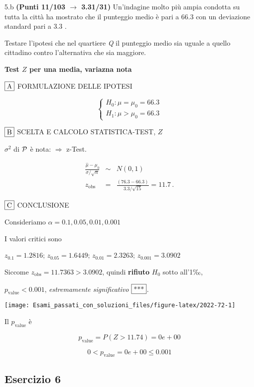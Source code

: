 \documentclass[
  11pt,
]{book}
\theoremstyle{mytheoremstyle}
\theoremstyle{mydefstyle}
\newenvironment{sol}
  {
  \begin{tcolorbox}[enhanced,breakable,arc=0.1mm,boxrule=1pt,colback=white,colframe=iblue,
  title=\bf \fontfamily{lmss}\selectfont \hspace{.5 cm} Soluzione,drop fuzzy shadow]

}{
\end{tcolorbox}
  }
\begin{document}
5.b \textbf{(Punti 11/103 \(\rightarrow\) 3.31/31)} Un'indagine molto più ampia condotta su tutta la città ha mostrato che
il punteggio medio è pari a 66.3 con un deviazione standard pari a 3.3 .

Testare l'ipotesi che nel quartiere \emph{Q} il punteggio medio sia uguale a quello cittadino contro l'alternativa che sia maggiore.

\begin{sol}
\textbf{Test \(Z\) per una media, variazna nota}

\(\fbox{A}\) FORMULAZIONE DELLE IPOTESI

\[\begin{cases}
   H_0: \mu = \mu_0=66.3 \\
   H_1: \mu > \mu_0=66.3 
   \end{cases}\]

\(\fbox{B}\) SCELTA E CALCOLO STATISTICA-TEST, \(Z\)

\(\sigma^{2}\) di \(\cal{P}\) è nota: \(\Rightarrow\) z-Test.

\begin{eqnarray*}
   \frac{\hat\mu - \mu_{0}} {\sigma/\sqrt{n}}&\sim&N(0,1)\\
   z_{\text{obs}}
   &=& \frac{ ( 76.3 -  66.3 )} { 3.3 /\sqrt{ 15 }}
   =   11.7 \, .
   \end{eqnarray*}

\(\fbox{C}\) CONCLUSIONE

Consideriamo \(\alpha=0.1, 0.05, 0.01, 0.001\)

I valori critici sono

\(z_{0.1}=1.2816\); \(z_{0.05}=1.6449\); \(z_{0.01}=2.3263\); \(z_{0.001}=3.0902\)

Siccome \(z_\text{obs}=11.7363>3.0902\), quindi \textbf{rifiuto} \(H_0\) sotto all'1‰,

\(p_\text{value}<0.001\), \emph{estremamente significativo} \(\fbox{***}\).

\begin{center}\texttt{[image: Esami\_passati\_con\_soluzioni\_files/figure-latex/2022-72-1]} \end{center}

Il \(p_{\text{value}}\) è

\[ p_{\text{value}} = P(Z>11.74)=0e+00 \]

\[
 0 < p_\text{value}= 0e+00 \leq 0.001 
\]

\end{sol}

\subsection{Esercizio 6}\label{esercizio-6-13}
\end{document}
